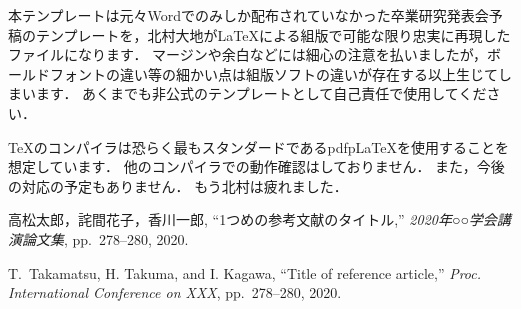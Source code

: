 \documentclass[a4j]{jsarticle}
\begin{document}
本テンプレートは元々Wordでのみしか配布されていなかった卒業研究発表会予稿のテンプレートを，北村大地がLaTeXによる組版で可能な限り忠実に再現したファイルになります．
マージンや余白などには細心の注意を払いましたが，ボールドフォントの違い等の細かい点は組版ソフトの違いが存在する以上生じてしまいます．
あくまでも非公式のテンプレートとして自己責任で使用してください．

TeXのコンパイラは恐らく最もスタンダードであるpdfpLaTeXを使用することを想定しています．
他のコンパイラでの動作確認はしておりません．
また，今後の対応の予定もありません．
もう北村は疲れました．


\begin{thebibliography}{9}%

  高松太郎，詫間花子，香川一郎,
  ``1つめの参考文献のタイトル,''
  {\em 2020年○○学会講演論文集}, pp.~278--280, 2020.

  T.~Takamatsu, H. Takuma, and I. Kagawa, 
  ``Title of reference article,''
  {\em Proc. International Conference on XXX}, pp.~278--280, 2020.


\end{thebibliography}
\end{document}
